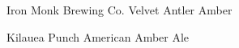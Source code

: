\begin{recipie}{Iron Monk Brewing Co. Velvet Antler Amber}
\begin{recipie}{Kilauea Punch American Amber Ale}
\begin{ingredientsblock}
\begin{yeasts}
\end{yeasts}

\end{ingredientsblock}

\end{recipie}

\end{recipie}